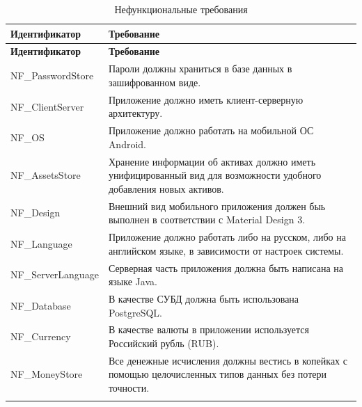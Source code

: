 \documentclass[a4paper, 14pt]{article}
\begin{document}
\begin{longtable}{| p{} | p{} |}
    \hline
    \textbf{Идентификатор} & \textbf{Требование}                                                                                               \\
    \hline
    \endfirsthead
    \hline
    \textbf{Идентификатор} & \textbf{Требование}                                                                                               \\
    \hline
    \endhead


    NF\_PasswordStore      & Пароли должны храниться в базе данных в зашифрованном виде.                                                       \\ \hline
    NF\_ClientServer       & Приложение должно иметь клиент-серверную архитектуру.                                                             \\ \hline
    NF\_OS                 & Приложение должно работать на мобильной ОС Android.                                                               \\ \hline
    NF\_AssetsStore        & Хранение информации об активах должно иметь унифицированный вид для возможности удобного добавления новых активов. \\ \hline
    NF\_Design             & Внешний вид мобильного приложения должен быь выполнен в соответствии с Material Design 3.                         \\ \hline
    NF\_Language           & Приложение должно работать либо на русском, либо на английском языке, в зависимости от настроек системы.          \\ \hline
    NF\_ServerLanguage     & Серверная часть приложения должна быть написана на языке Java.                                                    \\ \hline
    NF\_Database     & В качестве СУБД должна быть использована PostgreSQL.                                                    \\ \hline
    NF\_Currency     & В качестве валюты в приложении используется Российский рубль (RUB).                                                  \\ \hline
    NF\_MoneyStore     & Все денежные исчисления должны вестись в копейках с помощью целочисленных типов данных без потери точности.                                                  \\ \hline
    \caption{Нефункциональные требования}
\end{longtable}
\end{document}
